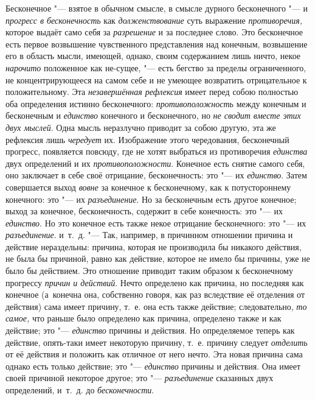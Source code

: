 
Бесконечное "--- взятое в обычном смысле, в смысле дурного бесконечного "--- и
{\em прогресс в бесконечность} как {\em долженствование} суть выражение
{\em противоречия,} которое выдаёт само себя за
{\em разрешение} и за последнее слово. Это бесконечное
есть первое возвышение чувственного представления над конечным, возвышение
его в область мысли, имеющей, однако, своим содержанием лишь ничто, некое
{\em нарочито} положенное как не-сущее, "--- есть бегство
за пределы ограниченного, не концентрирующееся на самом себе и не умеющее
возвратить отрицательное к положительному. Эта
{\em незавершённая рефлексия} имеет перед собою
полностью оба определения истинно бесконечного:
{\em противоположность} между конечным и бесконечным и
{\em единство} конечного и бесконечного, но
{\em не сводит вместе этих двух мыслей}. Одна мысль
неразлучно приводит за собою другую, эта же рефлексия лишь
{\em чередует} их. Изображение этого чередования,
бесконечный прогресс, появляется повсюду, где не хотят выбраться из
противоречия {\em единства} двух определений и их
{\em противоположности}. Конечное есть снятие самого
себя, оно заключает в себе своё отрицание, бесконечность: это "--- их
{\em единство}. Затем совершается выход
{\em вовне} за конечное к бесконечному, как к
потустороннему конечного: это "--- их {\em разъединение}.
Но за бесконечным есть другое конечное; выход за конечное, бесконечность,
содержит в себе конечность: это "--- их {\em единство}. Но
это конечное есть также некое отрицание бесконечного: это "--- их
{\em разъединение}. и~т.~д. "--- Так, например, в
причинном отношении причина и действие нераздельны: причина, которая не
производила бы никакого действия, не была бы причиной, равно как действие,
которое не имело бы причины, уже не было бы действием. Это отношение
приводит таким образом к бесконечному прогрессу
{\em причин и действий}. Нечто определено как причина,
но последняя как конечное (а~конечна она, собственно говоря, как раз
вследствие её отделения от действия) сама имеет причину, т.~е. она есть
также действие; следовательно, {\em то самое,} что
раньше было определено как причина, определено также и как действие; это
"--- {\em единство} причины и действия. Но определяемое
теперь как действие, опять-таки имеет некоторую причину, т.~е. причину
следует {\em отделить} от её действия и положить как
отличное от него нечто. Эта новая причина сама однако есть только действие;
это "--- {\em единство} причины и действия. Она имеет
своей причиной некоторое другое; это
"--- {\em разъединение} сказанных двух определений,
и~т.~д. до {\em бесконечности}.

